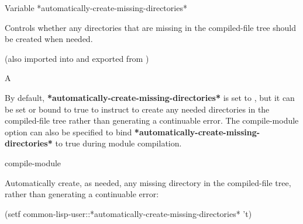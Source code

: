 \documentclass[10pt,twoside,english,pdftex]{article}
\begin{document}
\W\entities
\T\clearpage
\T\renewcommand{\headrulewidth}{0.01pt}


\begin{functiondoc}{Variable}%
  {*automatically-create-missing-directories*}{}%

\fnsyntax

\fnpurpose Controls whether any directories that are missing
in the compiled-file tree should be created when needed.

\fnpackage {} 
(also imported into and exported from )

\fnmodule {}

\fnvaluetype A 

\fninitialvalue {}

\fndescription By default, \textbf{*automatically-create-missing-directories*}
is set to , but it can be set or bound to true to instruct
\textbf{} to create any needed directories in the
compiled-file tree rather than generating a continuable error. The
compile-module option  can also be specified to bind
\textbf{*automatically-create-missing-directories*} to true during module
compilation.

\begin{alsos}{compile-module}
\end{alsos}

\fnexample 
Automatically create, as needed, any missing directory in the compiled-file
tree, rather than generating a continuable error:
\begin{example}
  (setf common-lisp-user::*automatically-create-missing-directories* 't)
\end{example}

\end{functiondoc}

\end{document}
